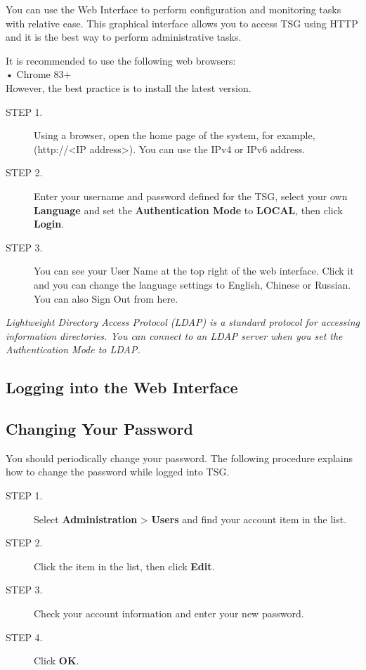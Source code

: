 You can use the Web Interface to perform configuration and monitoring tasks with relative ease. 
This graphical interface allows you to access TSG using HTTP and it is the best way to perform administrative tasks.


It is recommended to use the following web browsers:\\
• Chrome 83+\\
However, the best practice is to install the latest version.


\begin{description}
    \item[STEP 1.]Using a browser, open the home page of the system, for example, (http://<IP address>). You can use the IPv4 or IPv6 address.
    \item[STEP 2.]Enter your username and password defined for the TSG, select your own \textbf{Language} and set the \textbf{Authentication Mode} to \textbf{LOCAL}, then click \textbf{Login}.
    \item[STEP 3.]You can see your User Name at the top right of the web interface. Click it and you can change the language settings to English, Chinese or Russian. You can also Sign Out from here.
\end{description}


\notemark\textit{Lightweight Directory Access Protocol (LDAP) is a standard protocol for accessing information directories. 
You can connect to an LDAP server when you set the Authentication Mode to LDAP.}


\subsection*{\hypertarget{link:Logging into the Web Interface}{Logging into the Web Interface}}
\label{sec:intro:logging:for}

\subsection*{\hypertarget{link:Changing Your Password}{Changing Your Password}}
\label{sec:intro:logging:password}

You should periodically change your password. The following procedure explains how to change the password while logged into TSG.


\begin{description}
    \item[STEP 1.]Select \textbf{Administration} > \textbf{Users} and find your account item in the list.
    \item[STEP 2.]Click the item in the list, then click \textbf{Edit}.
    \item[STEP 3.]Check your account information and enter your new password.
    \item[STEP 4.]Click \textbf{OK}.\\
\end{description}

